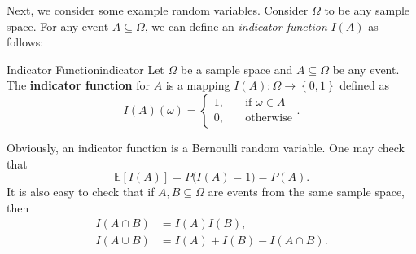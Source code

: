 \documentclass[math, code]{amznotes}
\theoremstyle{remark}
\begin{document}
Next, we consider some example random variables. Consider $\Omega$ to be any sample space. For any event $A \subseteq \Omega$, we can define an \textit{indicator function} $I\left(A\right)$ as follows:
\begin{dfnbox}{Indicator Function}{indicator}
    Let $\Omega$ be a sample space and $A \subseteq \Omega$ be any event. The {\color{red} \textbf{indicator function}} for $A$ is a mapping $I\left(A\right) \colon \Omega \to \left\{0, 1\right\}$ defined as 
    \begin{equation*}
        I\left(A\right)\left(\omega\right) = \begin{cases}
            1, & \quad\textrm{if } \omega \in A \\
            0, & \quad\textrm{otherwise}
        \end{cases}.
    \end{equation*} 
\end{dfnbox}
Obviously, an indicator function is a Bernoulli random variable. One may check that 
\begin{equation*}
    \mathbb{E}\left[I\left(A\right)\right] = P\bigl(I\left(A\right) = 1\bigr) = P\left(A\right).
\end{equation*}
It is also easy to check that if $A, B \subseteq \Omega$ are events from the same sample space, then 
\begin{align*}
    I\left(A \cap B\right) & = I\left(A\right)I\left(B\right), \\
    I\left(A \cup B\right) & = I\left(A\right) + I\left(B\right) - I\left(A \cap B\right).
\end{align*}
\end{document}
